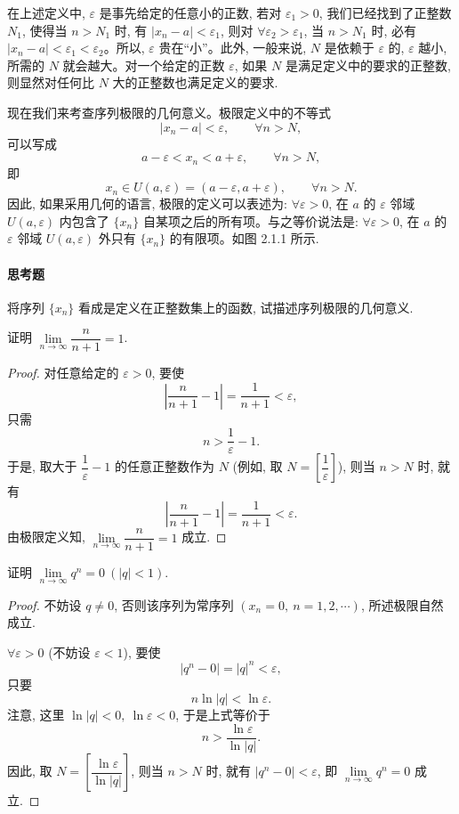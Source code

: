 在上述定义中, $\varepsilon$ 是事先给定的任意小的正数, 若对 $\varepsilon_1>0$, 我们已经找到了正整数 $N_1$, 使得当 $n>N_1$ 时, 有 $|x_n-a|<\varepsilon_1$, 则对 $\forall\varepsilon_2>\varepsilon_1$, 当 $n>N_1$ 时, 必有 $|x_n-a|<\varepsilon_1<\varepsilon_2$。所以, $\varepsilon$ 贵在``小''。此外, 一般来说, $N$ 是依赖于 $\varepsilon$ 的, $\varepsilon$ 越小, 所需的 $N$ 就会越大。对一个给定的正数 $\varepsilon$, 如果 $N$ 是满足定义中的要求的正整数, 则显然对任何比 $N$ 大的正整数也满足定义的要求.

现在我们来考查序列极限的几何意义。极限定义中的不等式
\[
  |x_n-a|<\varepsilon,\qquad \forall n>N,
\]
可以写成
\[
  a-\varepsilon<x_n<a+\varepsilon,\qquad \forall n>N,
\]
即
\[
  x_n\in U(a,\varepsilon)=(a-\varepsilon,a+\varepsilon),\qquad \forall n>N.
\]
因此, 如果采用几何的语言, 极限的定义可以表述为: $\forall\varepsilon>0$, 在 $a$ 的 $\varepsilon$ 邻域 $U(a,\varepsilon)$ 内包含了 $\{x_n\}$ 自某项之后的所有项。与之等价说法是: $\forall\varepsilon>0$, 在 $a$ 的 $\varepsilon$ 邻域 $U(a,\varepsilon)$ 外只有 $\{x_n\}$ 的有限项。如图 2.1.1 所示.

\paragraph*{思考题}
将序列 $\{x_n\}$ 看成是定义在正整数集上的函数, 试描述序列极限的几何意义.

\begin{example}\label{example:ma-2-1-5}
证明 $\lim\limits_{n\to\infty}\dfrac{n}{n+1}=1$.
\end{example}


\begin{proof}
对任意给定的 $\varepsilon>0$, 要使
\[
  \left|\frac{n}{n+1}-1\right|
  =
  \frac1{n+1}<\varepsilon,
\]
只需
\[
  n>\frac1\varepsilon-1.
\]
于是, 取大于 $\dfrac1\varepsilon-1$ 的任意正整数作为 $N$ (例如, 取 $N=\left[\dfrac1\varepsilon\right]$), 则当 $n>N$ 时, 就有
\[
  \left|\frac{n}{n+1}-1\right|
  =
  \frac1{n+1}<\varepsilon.
\]
由极限定义知, $\lim\limits_{n\to\infty}\dfrac{n}{n+1}=1$ 成立.
\end{proof}


\begin{example}\label{example:ma-2-1-6}
证明 $\lim\limits_{n\to\infty}q^n=0\ (|q|<1)$.
\end{example}


\begin{proof}
不妨设 $q\ne0$, 否则该序列为常序列 $(x_n=0,\ n=1,2,\cdots)$, 所述极限自然成立.

$\forall\varepsilon>0$ (不妨设 $\varepsilon<1$), 要使
\[
  |q^n-0|=|q|^n<\varepsilon,
\]
只要
\[
  n\ln |q|<\ln\varepsilon.
\]
注意, 这里 $\ln |q|<0,\ \ln\varepsilon<0$, 于是上式等价于
\[
  n>\frac{\ln\varepsilon}{\ln |q|}.
\]
因此, 取 $N=\left[\dfrac{\ln\varepsilon}{\ln |q|}\right]$, 则当 $n>N$ 时, 就有 $|q^n-0|<\varepsilon$, 即 $\lim\limits_{n\to\infty}q^n=0$ 成立.
\end{proof}


